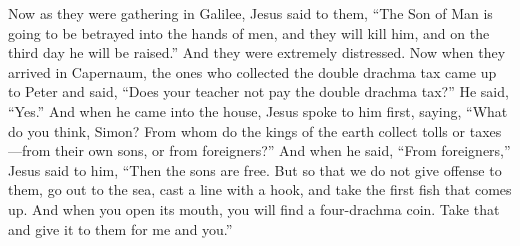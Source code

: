 \begin{biblechapter}
 Now as they were gathering in Galilee, Jesus said to them, “The Son of Man is going to be betrayed into the hands of men,
\verse and they will kill him, and on the third day he will be raised.” And they were extremely distressed.
 Now when they arrived in Capernaum, the ones who collected the double drachma tax came up to Peter and said, “Does your teacher not pay the double drachma tax?”
\verse He said, “Yes.” And when he came into the house, Jesus spoke to him first, saying, “What do you think, Simon? From whom do the kings of the earth collect tolls or taxes—from their own sons, or from foreigners?”
\verse And when he said, “From foreigners,” Jesus said to him, “Then the sons are free.
\verse But so that we do not give offense to them, go out to the sea, cast a line with a hook, and take the first fish that comes up. And when you open its mouth, you will find a four-drachma coin. Take that and give it to them for me and you.”
\end{biblechapter}

